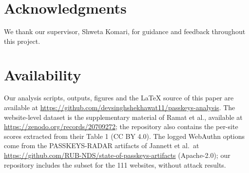 \documentclass[letterpaper,twocolumn,10pt]{article}
\begin{document}
\section*{Acknowledgments}

We thank our supervisor, Shweta Komari, for guidance and feedback throughout this project.

\section*{Availability}

Our analysis scripts, outputs, figures and the LaTeX source of this paper are available at \url{https://github.com/devsinghshekhawat11/passkeys-analysis}. The website-level dataset is the supplementary material of Ramat et al., available at \url{https://zenodo.org/records/20709272}; the repository also contains the per-site scores extracted from their Table 1 (CC BY 4.0). The logged WebAuthn options come from the PASSKEYS-RADAR artifacts of Jannett et al.~at \url{https://github.com/RUB-NDS/state-of-passkeys-artifacts} (Apache-2.0); our repository includes the subset for the 111 websites, without attack results.
\end{document}
